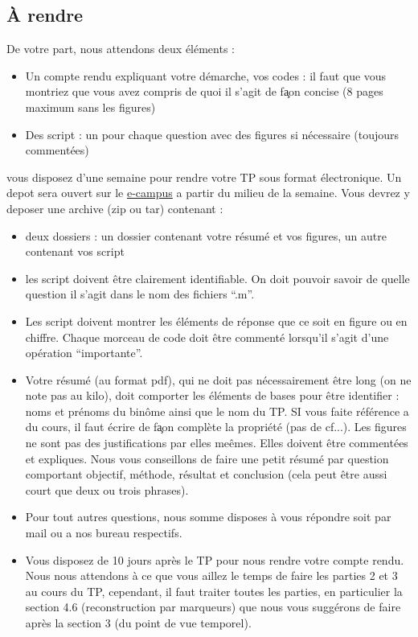 \documentclass[10pt,a4paper]{article}
\begin{document}
\subsection{\`{A} rendre}
De votre part, nous attendons deux \'{e}l\'{e}ments : 
\begin{itemize}
	\item Un compte rendu expliquant votre d\'{e}marche, vos codes : il faut que vous montriez que vous avez compris de quoi il s'agit de fa\c{}on concise (8 pages maximum sans les figures)
	\item Des script : un pour chaque question avec des figures si n\'{e}cessaire (toujours comment\'{e}es)
\end{itemize}
vous disposez d'une semaine pour rendre votre TP sous format \'{e}lectronique. Un depot sera ouvert sur le \href{https://e-campus.cpe.fr/course/view.php?id=2548}{e-campus} a partir du milieu de la semaine. Vous devrez y deposer une archive (zip ou tar) contenant : 
\begin{itemize}
	\item deux dossiers : un dossier contenant votre r\'{e}sum\'{e} et vos figures, un autre contenant vos script
	\item les script doivent \^{e}tre clairement identifiable. On doit pouvoir savoir de quelle question il s'agit dans le nom des fichiers ``.m''. 
	\item Les script doivent montrer les \'{e}l\'{e}ments de r\'{e}ponse que ce soit en figure ou en chiffre. Chaque morceau de code doit \^{e}tre comment\'{e} lorsqu'il s'agit d'une op\'{e}ration ``importante''.
	\item Votre r\'{e}sum\'{e} (au format pdf), qui ne doit pas n\'{e}cessairement \^{e}tre long (on ne note pas au kilo), doit comporter les \'{e}l\'{e}ments de bases pour \^{e}tre identifier : noms et pr\'{e}noms du bin\^{o}me ainsi que le nom du TP. SI vous faite r\'{e}f\'{e}rence a du cours, il faut \'{e}crire de fa\c{}on compl\`{e}te la propri\'{e}t\'{e} (pas de cf...). Les figures ne sont pas des justifications par elles me\^{e}mes. Elles doivent \^{e}tre comment\'{e}es et expliques. Nous vous conseillons de faire une petit r\'{e}sum\'{e} par question comportant objectif, m\'{e}thode, r\'{e}sultat et conclusion (cela peut \^{e}tre aussi court que deux ou trois phrases).
	\item Pour tout autres questions, nous somme disposes \`{a} vous r\'{e}pondre soit par mail ou a nos bureau respectifs.
	\item Vous disposez de 10 jours apr\`{e}s le TP pour nous rendre votre compte rendu. Nous nous attendons \`{a} ce que vous aillez le temps de faire les parties 2 et 3 au cours du TP, cependant, il faut traiter toutes les parties, en particulier la section 4.6 (reconstruction par marqueurs) que nous vous sugg\'{e}rons de faire apr\`{e}s la section 3 (du point de vue temporel).
\end{itemize}
\end{document}
